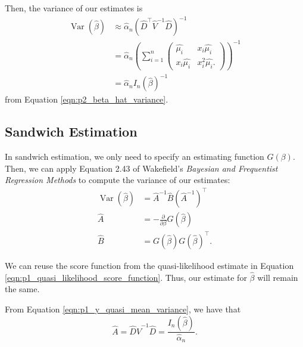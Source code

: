 \documentclass[letterpaper,11pt]{article}
\begin{document}
\begin{enumerate}
\begin{description}
    Then, the variance of our estimates is
    \begin{align}
      \operatorname{Var}\left(
      \hat{\beta}
      \right)
      &\approx
      \hat{\alpha}_n\left(\hat{D}^\intercal \hat{V}^{-1} \hat{D}\right)^{-1} \nonumber\\
      &= \hat{\alpha}_n\left(\sum_{i=1}^n
        \begin{pmatrix}
          \hat{\mu_i} & x_i\hat{\mu_i} \\
          x_i\hat{\mu_i} & x_i^2\hat{\mu_i}.
        \end{pmatrix}\right)^{-1}
        \nonumber\\
      &= \hat{\alpha}_nI_n\left(\hat{\beta}\right)^{-1}
    \end{align}
    from Equation \ref{eqn:p2_beta_hat_variance}.

    \subsection*{Sandwich Estimation}

    In sandwich estimation, we only need to specify an estimating function
    $G\left(\beta\right)$. Then, we can apply Equation 2.43 of Wakefield's
    \emph{Bayesian and Frequentist Regression Methods} to compute the variance
    of our estimates:
    \begin{align}
      \operatorname{Var}\left(\hat{\beta}\right)
      &= \hat{A}^{-1}\hat{B}\left(\hat{A}^{-1}\right)^\intercal \nonumber\\
      \hat{A} &= -\frac{\partial}{\partial\beta}G\left(\hat{\beta}\right) \nonumber\\
      \hat{B} &= G\left(\hat{\beta}\right)G\left(\hat{\beta}\right)^\intercal. \nonumber
    \end{align}

    We can reuse the score function from the quasi-likelihood estimate in
    Equation \ref{eqn:p1_quasi_likelihood_score_function}. Thus, our estimate
    for $\hat{\beta}$ will remain the same.

    From Equation \ref{eqn:p1_y_quasi_mean_variance}, we have that
    \begin{equation}
      \hat{A} = \hat{D}\hat{V}^{-1}\hat{D} = \frac{I_n\left(\hat{\beta}\right)}{\hat{\alpha}_n}.
    \end{equation}


\end{description}
\end{enumerate}
\end{document}
